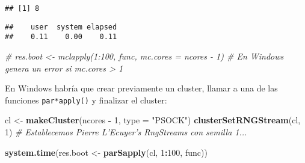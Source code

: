 \documentclass[
]{book}
\newenvironment{Shaded}{\begin{snugshade}}{\end{snugshade}}
\newcommand{\CommentTok}[1]{\textcolor[rgb]{0.56,0.35,0.01}{\textit{#1}}}
\newcommand{\ControlFlowTok}[1]{\textcolor[rgb]{0.13,0.29,0.53}{\textbf{#1}}}
\newcommand{\DataTypeTok}[1]{\textcolor[rgb]{0.13,0.29,0.53}{#1}}
\newcommand{\DecValTok}[1]{\textcolor[rgb]{0.00,0.00,0.81}{#1}}
\newcommand{\KeywordTok}[1]{\textcolor[rgb]{0.13,0.29,0.53}{\textbf{#1}}}
\newcommand{\NormalTok}[1]{#1}
\newcommand{\OperatorTok}[1]{\textcolor[rgb]{0.81,0.36,0.00}{\textbf{#1}}}
\newcommand{\OtherTok}[1]{\textcolor[rgb]{0.56,0.35,0.01}{#1}}
\newcommand{\StringTok}[1]{\textcolor[rgb]{0.31,0.60,0.02}{#1}}
\theoremstyle{break}
\theoremstyle{definition}
\theoremstyle{definition}
\theoremstyle{definition}
\theoremstyle{remark}
\begin{document}
\begin{verbatim}
## [1] 8
\end{verbatim}

\begin{Shaded}
\end{Shaded}

\begin{verbatim}
##    user  system elapsed 
##    0.11    0.00    0.11
\end{verbatim}

\begin{Shaded}
\begin{Highlighting}[]
\CommentTok{# res.boot <- mclapply(1:100, func, mc.cores = ncores - 1) # En Windows genera un error si mc.cores > 1}
\end{Highlighting}
\end{Shaded}

En Windows habría que crear previamente un cluster, llamar a una de las funciones
\texttt{par*apply()} y finalizar el cluster:

\begin{Shaded}
\begin{Highlighting}[]
\NormalTok{cl <-}\StringTok{ }\KeywordTok{makeCluster}\NormalTok{(ncores }\OperatorTok{-}\StringTok{ }\DecValTok{1}\NormalTok{, }\DataTypeTok{type =} \StringTok{"PSOCK"}\NormalTok{)}
\KeywordTok{clusterSetRNGStream}\NormalTok{(cl, }\DecValTok{1}\NormalTok{) }\CommentTok{# Establecemos Pierre L'Ecuyer's RngStreams con semilla 1...}

\KeywordTok{system.time}\NormalTok{(res.boot <-}\StringTok{ }\KeywordTok{parSapply}\NormalTok{(cl, }\DecValTok{1}\OperatorTok{:}\DecValTok{100}\NormalTok{, func))}
\end{Highlighting}
\end{Shaded}
\end{document}
